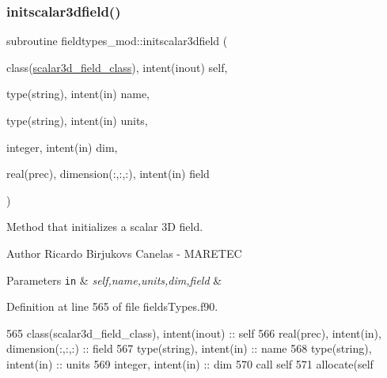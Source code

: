 \subsubsection{\texorpdfstring{initscalar3dfield()}{initscalar3dfield()}}
{\footnotesize\ttfamily subroutine fieldtypes\+\_\+mod\+::initscalar3dfield (\begin{DoxyParamCaption}\item[{class(\mbox{\hyperlink{structfieldtypes__mod_1_1scalar3d__field__class}{scalar3d\+\_\+field\+\_\+class}}), intent(inout)}]{self,  }\item[{type(string), intent(in)}]{name,  }\item[{type(string), intent(in)}]{units,  }\item[{integer, intent(in)}]{dim,  }\item[{real(prec), dimension(\+:,\+:,\+:), intent(in)}]{field }\end{DoxyParamCaption})\hspace{0.3cm}{\ttfamily [private]}}



Method that initializes a scalar 3D field. 

\begin{DoxyAuthor}{Author}
Ricardo Birjukovs Canelas -\/ M\+A\+R\+E\+T\+EC 
\end{DoxyAuthor}

\begin{DoxyParams}[1]{Parameters}
\mbox{\tt in}  & {\em self,name,units,dim,field} & \\
\hline
\end{DoxyParams}


Definition at line 565 of file fields\+Types.\+f90.


\begin{DoxyCode}
565     \textcolor{keywordtype}{class}(scalar3d\_field\_class), \textcolor{keywordtype}{intent(inout)} :: self
566     \textcolor{keywordtype}{real(prec)}, \textcolor{keywordtype}{intent(in)}, \textcolor{keywordtype}{dimension(:,:,:)} :: field
567     \textcolor{keywordtype}{type}(string), \textcolor{keywordtype}{intent(in)} :: name
568     \textcolor{keywordtype}{type}(string), \textcolor{keywordtype}{intent(in)} :: units
569     \textcolor{keywordtype}{integer}, \textcolor{keywordtype}{intent(in)} :: dim
570     \textcolor{keyword}{call }self%
571     \textcolor{keyword}{allocate}(self%
\end{DoxyCode}
\mbox{\label{namespacefieldtypes__mod_a21dba84bb8fdb02d8bf5fd0052b51283}} 
